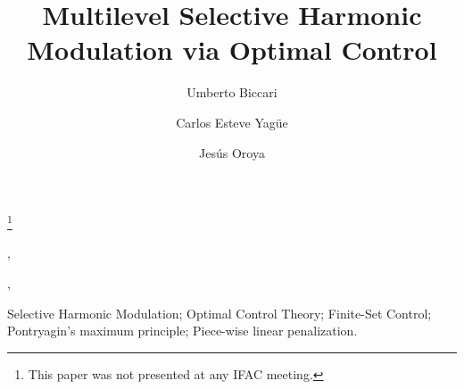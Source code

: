 \documentclass[twocolumn]{autart}    %
\begin{document}
\begin{frontmatter}
 
\title{Multilevel Selective Harmonic Modulation via Optimal Control} %

\thanks[footnoteinfo]{This paper was not presented at any IFAC meeting.}

\author[FD,UD]{Umberto Biccari},    %
\author[UAM,FD]{Carlos Esteve Yagüe},               %
\author[UD]{Jes\'us Oroya}  %
\address[FD]{Chair of Computational Mathematics, Fundaci\'on Deusto, Avenida de las Universidades 24, 48007 Bilbao, Basque Country, Spain.}  %
\address[UD]{Universidad de Deusto, Avenida de las Universidades 24, 48007 Bilbao, Basque Country, Spain.}  %
\address[UAM]{Departamento de Matem\'aticas, Universidad Aut\'onoma de Madrid, 28049 Madrid, Spain.}  %
          
\begin{keyword}                           %
Selective Harmonic Modulation; Optimal Control Theory; Finite-Set Control; Pontryagin's maximum principle; Piece-wise linear penalization.    %
\end{keyword}                             %



\end{frontmatter}
\end{document}
